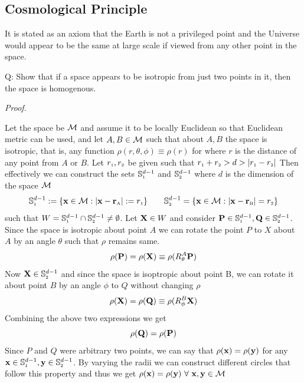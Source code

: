 \subsection{Cosmological Principle}
It is stated as an axiom that the Earth is not a privileged point  and the Universe would appear to be the same at large scale if viewed from any other point in the space. 
\begin{tcolorbox}[colframe=black, colback=lime!20!white, boxrule=1.5pt, arc=4pt]
    Q: Show that if a space appears to be isotropic from just two points in it, then the space is homogenous.
\end{tcolorbox}
\noindent
\textit{Proof.}
\begin{figure}[H]
    \centering 
    
\end{figure}
\noindent
Let the space be $\mathcal M$ and assume it to be locally Euclidean so that Euclidean metric can be used, and let $A,B\in \mathcal M$ such that about $A,B$ the space is isotropic, that is, any function $\rho(r,\theta,\phi)\equiv \rho(r)$ for  where $r$ is the distance of any point from $A$ or $B$. Let $r_{\text{\tiny 1}}, r_{\text{\tiny 2}}$ be given such that $r_{\text{\tiny 1}}+r_{\text{\tiny 2}}>d>|r_{\text{\tiny 1}}-r_{\text{\tiny 2}}|$ Then effectively we can construct the sets $\mathbb{S}^{d-1}_{\text{\tiny 1}}$ and $\mathbb{S}^{d-1}_{\text{\tiny 2}}$ where $d$ is the dimension of the space $\mathcal M$
$$\mathbb{S}^{d-1}_{\text{\tiny 1}} := \{\vb{x} \in \mathcal M : |\vb{x} - \vb{r}_{\text{\tiny A}}| := r_{\text{\tiny 1}}\}\qquad \mathbb{S}^{d-1}_{\text{\tiny 2}} = \{\vb{x} \in \mathcal M : |\vb{x} - \vb{r}_{\text{\tiny B}}| = r_{\text{\tiny 2}}\}$$
such that $W = \mathbb{S}^{d-1}_{\text{\tiny 1}}  \cap \mathbb{S}^{d-1}_{\text{\tiny 2}} \neq \emptyset$. Let $\vb{X}\in W$ and consider $\vb{P}\in \mathbb{S}^{d-1}_{\text{\tiny 1}},\vb{Q}\in \mathbb{S}^{d-1}_{\text{\tiny 2}}$. Since the space is isotropic about point $A$ we can rotate the point $P$ to $X$ about $A$ by an angle $\theta$ such that $\rho$ remains same. 
$$\rho(\vb{P}) = \rho(\vb{X})\equiv \rho(R^A_{\theta}\vb{P}) $$
Now $\vb{X}\in \mathbb{S}^{d-1}_{\text{\tiny 2}}$ and since the space is isoptropic about point B, we can rotate it about point $B$ by an angle $\phi$ to $Q$ without changing $\rho$
$$\rho(\vb{X}) = \rho(\vb{Q})\equiv \rho(R^B_\phi \vb{X})$$
Combining the above two expressions we get 
$$\rho(\vb{Q}) = \rho(\vb{P})$$
Since $P$ and $Q$ were arbitrary two points, we can say that $\rho(\vb{x}) = \rho(\vb{y})$ for any $\vb{x}\in \mathbb{S}^{d-1}_{\text{\tiny 1}},\vb{y}\in \mathbb{S}^{d-1}_{\text{\tiny 2}}$. By varying the radii we can construct different circles that follow this property and thus we get $\rho(\vb{x}) = \rho(\vb{y})\ \forall\ \vb{x}, \vb{y}\in \mathcal M$\\[0.2cm]
